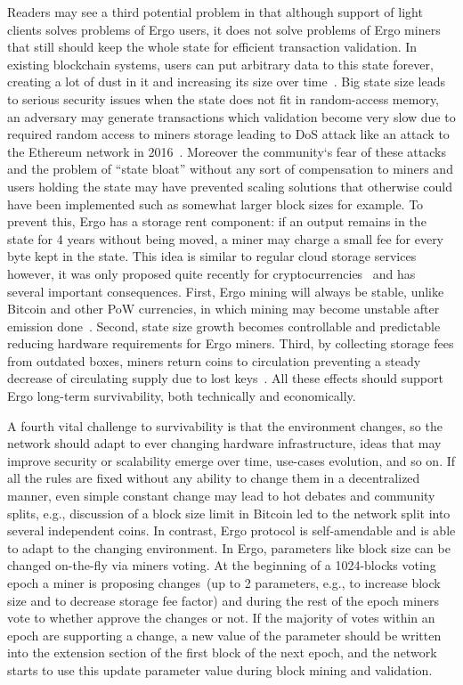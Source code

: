 Readers may see a third potential problem in that although support of light clients
solves problems of Ergo users, it does not solve problems
of Ergo miners that still should keep the whole state for efficient
transaction validation.
In existing blockchain systems, users can put arbitrary data to this state forever,
creating a lot of dust in it and increasing its size over time~\cite{perez2019another}.
Big state size leads to serious security issues when the state does not fit in random-access memory,
an adversary may generate transactions which validation become very slow due to required random
access to miners storage
leading to DoS attack like an attack to the Ethereum network in 2016~\cite{??}.
Moreover the community`s fear of these attacks and the problem of ``state bloat'' without any sort of
compensation to miners and users holding the state may have prevented scaling solutions that otherwise
could have been implemented such as somewhat larger block sizes for example.
To prevent this, Ergo has a storage rent component: if an
output remains in the state for 4 years without being moved, a miner may charge a small fee for every
byte kept in the state.
This idea is similar to regular cloud storage services however, it was only proposed quite recently for
cryptocurrencies~\cite{chepurnoy2017space} and has several important consequences.
First, Ergo mining will always be stable, unlike Bitcoin and other PoW currencies,
in which mining may become unstable after emission done~\cite{carlsten2016instability}.
Second, state size growth becomes controllable and predictable reducing hardware requirements for Ergo miners.
Third, by collecting storage fees from outdated boxes, miners return coins to circulation preventing a steady decrease
of circulating supply due to lost keys~\cite{wsj2018}.
All these effects should support Ergo long-term survivability, both technically and economically.

A fourth vital challenge to survivability is that the environment changes, so the network should
adapt to ever changing hardware infrastructure, ideas that may improve security or
scalability emerge over time, use-cases evolution, and so on.
If all the rules are fixed without any ability to change them in a decentralized manner, even
simple constant change may lead to hot debates and community splits, e.g., discussion of a block
size limit in Bitcoin led to the network split into several independent coins.
In contrast, Ergo protocol is self-amendable and is able to adapt to the changing environment.
In Ergo, parameters like block size can be changed on-the-fly via miners voting.
At the beginning of a 1024-blocks voting epoch a miner is proposing changes~(up to 2 parameters,
e.g., to increase block size and to decrease storage fee factor) and during the rest of the epoch miners
vote to whether approve the changes or not.
If the majority of votes within an epoch are supporting a change, a new value of
the parameter should be written into the extension section of the first block of the next epoch, and
the network starts to use this update parameter value during block mining and validation.

